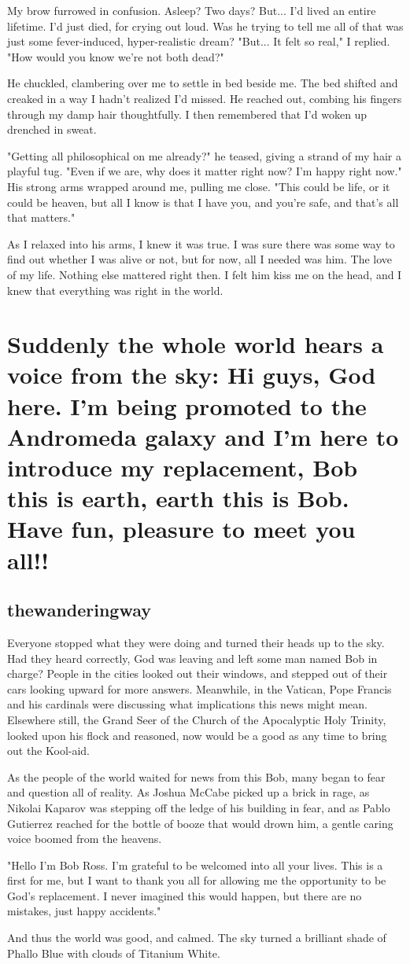 My brow furrowed in confusion. Asleep? Two days? But... I'd lived an entire lifetime. I'd just died, for crying out loud. Was he trying to tell me all of that was just some fever-induced, hyper-realistic dream? "But... It felt so real," I replied. "How would you know we're not both dead?"

He chuckled, clambering over me to settle in bed beside me. The bed shifted and creaked in a way I hadn't realized I'd missed. He reached out, combing his fingers through my damp hair thoughtfully. I then remembered that I'd woken up drenched in sweat.

"Getting all philosophical on me already?" he teased, giving a strand of my hair a playful tug. "Even if we are, why does it matter right now? I'm happy right now." His strong arms wrapped around me, pulling me close. "This could be life, or it could be heaven, but all I know is that I have you, and you're safe, and that's all that matters."

As I relaxed into his arms, I knew it was true. I was sure there was some way to find out whether I was alive or not, but for now, all I needed was him. The love of my life. Nothing else mattered right then. I felt him kiss me on the head, and I knew that everything was right in the world.

\chapter{Suddenly the whole world hears a voice from the sky: Hi guys, God here. I'm being promoted to the Andromeda galaxy and I'm here to introduce my replacement, Bob this is earth, earth this is Bob. Have fun, pleasure to meet you all!!}
\section{thewanderingway}
Everyone stopped what they were doing and turned their heads up to the sky. Had they heard correctly, God was leaving and left some man named Bob in charge? People in the cities looked out their windows, and stepped out of their cars looking upward for more answers. Meanwhile, in the Vatican, Pope Francis and his cardinals were discussing what implications this news might mean. Elsewhere still, the Grand Seer of the Church of the Apocalyptic Holy Trinity, looked upon his flock and reasoned, now would be a good as any time to bring out the Kool-aid.

As the people of the world waited for news from this Bob, many began to fear and question all of reality. As Joshua McCabe picked up a brick in rage, as Nikolai Kaparov was stepping off the ledge of his building in fear, and as Pablo Gutierrez reached for the bottle of booze that would drown him, a gentle caring voice boomed from the heavens.

"Hello I'm Bob Ross. I'm grateful to be welcomed into all your lives. This is a first for me, but I want to thank you all for allowing me the opportunity to be God's replacement. I never imagined this would happen, but there are no mistakes, just happy accidents."

And thus the world was good, and calmed. The sky turned a brilliant shade of Phallo Blue with clouds of Titanium White.